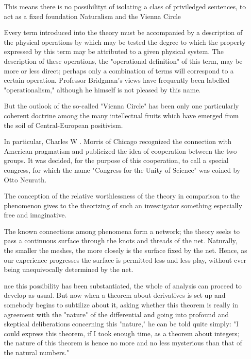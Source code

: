 This means there is no possibilityt of isolating a class of priviledged sentences, to act as a fixed foundation Naturalism and the Vienna Circle

Every term  introduced into the theory must be accompanied by  a description of the physical operations by which may  be tested the degree to which the property expressed  by this term may be attributed to a given physical  system. The description of these operations, the  "operational definition" of this term, may be more or  less direct; perhaps only a combination of terms will  correspond to a certain operation. Professor Bridgman's views have frequently been labelled "operationalism," although he himself is not pleased by this name.

But the outlook of the so-called "Vienna Circle"  has been only one particularly coherent doctrine  among the many intellectual fruits which have  emerged from the soil of Central-European positivism.

In particular, Charles  W . Morris of Chicago recognized the connection  with American pragmatism and publicized the idea  of cooperation between the two groups. It was decided, for the purpose of this cooperation, to call a  special congress, for which the name "Congress for  the Unity of Science" was coined by Otto Neurath.

The conception of the relative worthlessness of the theory in  comparison to the phenomenon gives to the theorizing  of such an investigator something especially free and  imaginative.

The known connections among  phenomena form a network; the theory seeks to pass  a continuous surface through the knots and threads  of the net. Naturally, the smaller the meshes, the  more closely is the surface fixed by the net. Hence,  as our experience progresses the surface is permitted  less and less play, without ever being unequivocally  determined by the net.

nce this possibility has been substantiated,  the whole of analysis can proceed to develop as usual.  But now when a theorem about derivatives is set up  and somebody begins to subtilize about it, asking  whether this theorem is really in agreement with the  "nature" of the differential and going into profound  and skeptical deliberations concerning this "nature,"  he can be told quite simply: "I could express this  theorem, if I took enough time, as a theorem about  integers; the nature of this theorem is hence no more  and no less mysterious than that of the natural  numbers."

